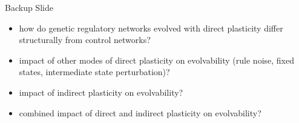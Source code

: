 \begin{frame}{Backup Slide}
\begin{itemize}
\item how do genetic regulatory networks evolved with direct plasticity differ structurally from control networks?
\item impact of other modes of direct plasticity on evolvability (rule noise, fixed states, intermediate state perturbation)?
\item impact of indirect plasticity on evolvability?
\item combined impact of direct and indirect plasticity on evolvability?
\end{itemize}
\end{frame}
